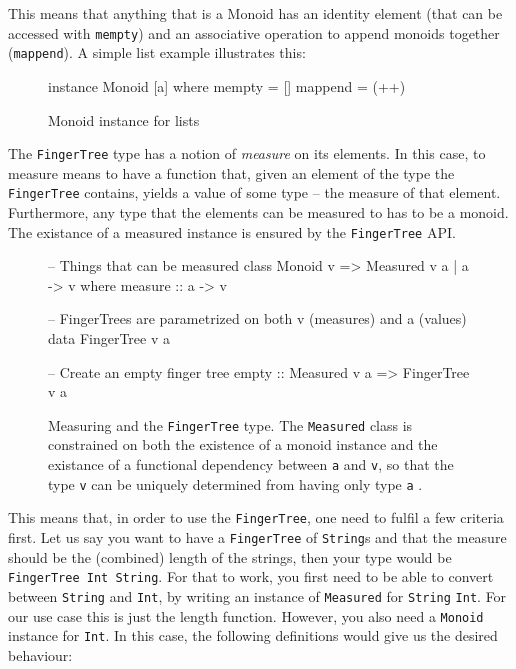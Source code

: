 \documentclass[a4paper,12pt,notitlepage]{report}
\renewcommand\cite{\citep}
\begin{document}
This means that anything that is a Monoid has an identity element (that can be
accessed with \texttt{mempty}) and an associative operation to append monoids
together (\texttt{mappend}). A simple list example illustrates this:

\begin{figure}[H]
\begin{code}
instance Monoid [a] where
    mempty = []
    mappend = (++)
\end{code}
\caption{Monoid instance for lists}
\end{figure}

The \texttt{FingerTree} type has a notion of \textit{measure} on its elements.
In this case, to measure means to have a function that, given an element of the
type the \texttt{FingerTree} contains, yields a value of some type -- the
measure of that element. Furthermore, any type that the elements can be measured
to has to be a monoid. The existance of a measured instance is ensured by the
\texttt{FingerTree} API. 

\begin{figure}[H]
\begin{code}
-- Things that can be measured
class Monoid v => Measured v a | a -> v where
    measure :: a -> v

-- FingerTrees are parametrized on both v (measures) and a (values)
data FingerTree v a

-- Create an empty finger tree
empty :: Measured v a => FingerTree v a
\end{code}
\caption{Measuring and the \texttt{FingerTree} type. The \texttt{Measured} class
is constrained on both the existence of a monoid instance and the existance of a
functional dependency between \texttt{a} and \texttt{v}, so that the type
\texttt{v} can be uniquely determined from having only type \texttt{a}
\cite{fundeps}.} 
\end{figure}

This means that, in order to use the \texttt{FingerTree}, one need to fulfil a
few criteria first. Let us say you want to have a \texttt{FingerTree} of
\texttt{String}s and that the measure should be the (combined) length of the
strings, then your type would be \texttt{FingerTree Int String}. For that to
work, you first need to be able to convert between \texttt{String} and
\texttt{Int}, by writing an instance of \texttt{Measured} for \texttt{String}
\texttt{Int}. For our use case this is just the length function. However, you
also need a \texttt{Monoid} instance for \texttt{Int}. In this case, the
following definitions would give us the desired behaviour:
\end{document}
